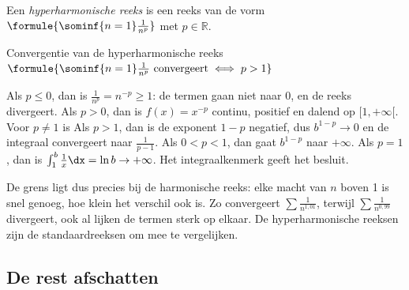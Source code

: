 \begin{theorie}
Een \emph{hyperharmonische reeks} is een reeks van de vorm \quad $\formule{\sominf{n=1} \frac{1}{n^p}}$ \quad met $p \in \mathbb{R}$.

\begin{stelling}{Convergentie van de hyperharmonische reeks}
\qquad $\formule{\sominf{n=1} \frac{1}{n^p} \text{ convergeert} \iff p > 1}$
\end{stelling}

\begin{bewijs}
Als $p \leqslant 0$, dan is $\tfrac1{n^p} = n^{-p} \geqslant 1$: de termen gaan niet naar 0, en de reeks divergeert. Als $p > 0$, dan is $f(x) = x^{-p}$ continu, positief en dalend op $[1, +\infty[$. Voor $p \neq 1$ is
Als $p > 1$, dan is de exponent $1 - p$ negatief, dus $b^{1-p} \to 0$ en de integraal convergeert naar $\tfrac{1}{p-1}$. Als $0 < p < 1$, dan gaat $b^{1-p}$ naar $+\infty$. Als $p = 1$, dan is $\int_1^b \tfrac1x\dx = \ln b \to +\infty$. Het integraalkenmerk geeft het besluit.
\end{bewijs}
\end{theorie}

De grens ligt dus precies bij de harmonische reeks: elke macht van $n$ boven 1 is snel genoeg, hoe klein het verschil ook is. Zo convergeert $\sum \tfrac1{n^{1{,}01}}$, terwijl $\sum \tfrac1{n^{0{,}99}}$ divergeert, ook al lijken de termen sterk op elkaar. De hyperharmonische reeksen zijn de standaardreeksen om mee te vergelijken.



\begin{oefeningen}
\end{oefeningen}

\subsection{De rest afschatten}

